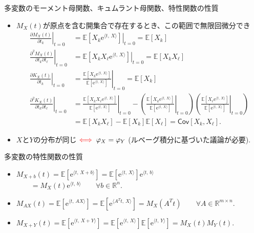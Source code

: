 \documentclass[lualatex,handout]{beamer}
\newcommand{\mycolor}[2]{%
  \begingroup
  \colorlet{currentcolor}{.}%
  \color{#1}#2%
  \color{currentcolor}%
  \endgroup
}
\newcommand{\emm}[1]{\mycolor{red}{#1}}
\newcommand{\expt}[1]{\mathbb{E}\left[#1\right]}
\newcommand{\cov}[1]{\mathsf{Cov}\left[#1\right]}
\theoremstyle{definition}
\begin{document}
\begin{frame}{多変数のモーメント母関数、キュムラント母関数、特性関数の性質}
\small
\begin{itemize}
\setlength{\itemsep}{1em}
\item $M_X(t)$が原点を含む開集合で存在するとき、この範囲で無限回微分でき
\begin{align*}
\left.\frac{\partial M_X(t)}{\partial t_k}\right|_{t=0} &= \left.\expt{X_k\mathrm{e}^{\langle t,\, X\rangle}}\right|_{t=0} = \expt{X_k}\\
\left.\frac{\partial^2 M_X(t)}{\partial t_k\partial t_\ell}\right|_{t=0} &= \left.\expt{X_kX_\ell\mathrm{e}^{\langle t,\, X\rangle}}\right|_{t=0} = \expt{X_kX_\ell}\\
\left.\frac{\partial K_X(t)}{\partial t_k}\right|_{t=0} &= \left.\frac{\expt{X_k\mathrm{e}^{\langle t,\, X\rangle}}}{\expt{\mathrm{e}^{\langle t,\, X\rangle}}}\right|_{t=0} = \expt{X_k}\\
\left.\frac{\partial^2 K_X(t)}{\partial t_k\partial t_\ell}\right|_{t=0} &= \left.\frac{\expt{X_kX_\ell\mathrm{e}^{\langle t,\, X\rangle}}}{\expt{\mathrm{e}^{\langle t,\, X\rangle}}}\right|_{t=0} - \left(\left.\frac{\expt{X_k\mathrm{e}^{\langle t,\, X\rangle}}}{\expt{\mathrm{e}^{\langle t,\, X\rangle}}}\right|_{t=0}\right)\left(\left.\frac{\expt{X_\ell\mathrm{e}^{\langle t,\, X\rangle}}}{\expt{\mathrm{e}^{\langle t,\, X\rangle}}}\right|_{t=0}\right)\\
&= \expt{X_kX_\ell} - \expt{X_k}\expt{X_\ell} = \cov{X_k, X_\ell}.
\end{align*}
\item $X$と$Y$の分布が同じ$\emm{\iff}\varphi_X=\varphi_Y$ (ルベーグ積分に基づいた議論が必要).
\end{itemize}


\vspace{1em}
\end{frame}

\begin{frame}{多変数の特性関数の性質}
\small
\begin{itemize}
\setlength{\itemsep}{3em}
\item $M_{X+b}(t) = \expt{\mathrm{e}^{\langle t,\, X+b\rangle}} = \expt{\mathrm{e}^{\langle t,\, X\rangle}}\mathrm{e}^{\langle t,\,b\rangle}$\\
$\qquad = M_X(t)\mathrm{e}^{\langle t,\, b\rangle}\qquad\forall b\in\mathbb{R}^n$.
\item $M_{AX}(t) = \expt{\mathrm{e}^{\langle t,\, AX\rangle}} = \expt{\mathrm{e}^{\langle A^Tt,\, X\rangle}} = M_X(A^Tt)\qquad\forall A\in\mathbb{R}^{m\times n}$.
\item $M_{X+Y}(t) = \expt{\mathrm{e}^{\langle t,\, X+Y\rangle}} = \expt{\mathrm{e}^{\langle t,\, X\rangle}}\expt{\mathrm{e}^{\langle t,\, Y\rangle}}= M_X(t)M_Y(t)$.
\end{itemize}
\end{frame}
\end{document}
